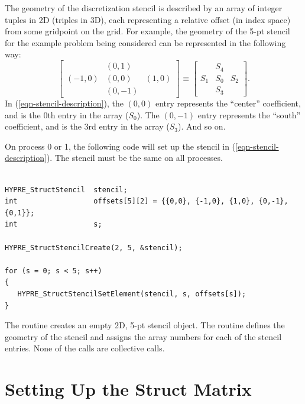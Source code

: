 The geometry of the discretization stencil is described by an array of
integer tuples in 2D (triples in 3D), each representing a relative
offset (in index space) from some gridpoint on the grid.  For example,
the geometry of the 5-pt stencil for the example problem being
considered can be represented in the following way:
\begin{equation}\label{eqn-stencil-description}
\left [
\begin{array}{ccc}
        & ( 0, 1) &         \\
(-1, 0) & ( 0, 0) & ( 1, 0) \\
        & ( 0,-1) &        
\end{array}
\right ]
\equiv
\left [
\begin{array}{ccc}
    & S_4 &     \\
S_1 & S_0 & S_2 \\
    & S_3 &    
\end{array}
\right ] .
\end{equation}
In (\ref{eqn-stencil-description}), the $(0,0)$ entry represents the
``center'' coefficient, and is the 0th entry in the array ($S_0$).
The $(0,-1)$ entry represents the ``south'' coefficient, and is the
3rd entry in the array ($S_3$).  And so on.

On process 0 or 1, the following code will set up the stencil in
(\ref{eqn-stencil-description}).  The stencil must be the same on all
processes.
\begin{display}
\begin{verbatim}

HYPRE_StructStencil  stencil;
int                  offsets[5][2] = {{0,0}, {-1,0}, {1,0}, {0,-1}, {0,1}};
int                  s;

HYPRE_StructStencilCreate(2, 5, &stencil);

for (s = 0; s < 5; s++)
{
   HYPRE_StructStencilSetElement(stencil, s, offsets[s]);
}

\end{verbatim}
\end{display}
The  routine creates an empty 2D, 5-pt stencil object.
The  routine defines the geometry of the stencil
and assigns the array numbers for each of the stencil entries.  None
of the calls are collective calls.


\section{Setting Up the Struct Matrix}
\label{Setting Up the Struct Matrix}

